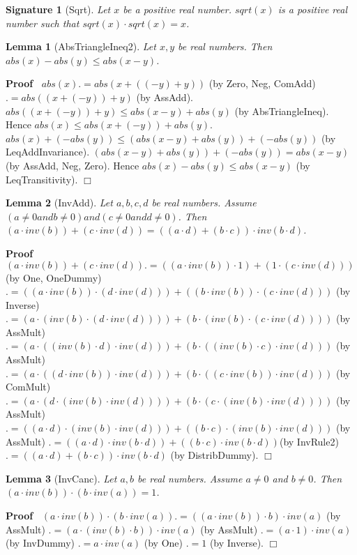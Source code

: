 \documentclass{article}
\newenvironment{forthel}{\begin{leftbar}}{\end{leftbar}}
\newenvironment{proof}{\noindent\textbf{Proof\ }}{\hspace*{\fill}$\Box$\medskip}
\newtheorem{lemma}{Lemma}
\newtheorem{signature}{Signature}
\begin{document}
\begin{forthel}
	
	
	\begin{signature}[Sqrt]
	Let $x$ be a positive real number. $sqrt(x)$ is a positive real number such that $sqrt(x) \cdot sqrt(x) = x$.
	\end{signature}
	
	\begin{lemma}[AbsTriangleIneq2]
	Let $x,y$ be real numbers. Then $abs(x) - abs(y) \leq abs(x - y)$.
	\end{lemma}
	\begin{proof}
	$abs(x) .= abs(x + ((-y) + y))$ (by Zero, Neg, ComAdd)
	$.= abs((x + (-y)) + y)$ (by AssAdd).
	$abs((x + (-y)) + y) \leq abs(x - y) + abs(y)$ (by AbsTriangleIneq).
	Hence $abs(x) \leq abs(x + (-y)) + abs(y)$.
	$abs(x) + (-abs(y)) \leq (abs(x - y) + abs(y)) + (-abs(y))$ (by LeqAddInvariance).
	$(abs(x - y) + abs(y)) + (-abs(y)) = abs(x - y)$ (by AssAdd, Neg, Zero).
	Hence $abs(x) - abs(y) \leq abs(x - y)$ (by LeqTransitivity).
	\end{proof}
	
	
	\begin{lemma}[InvAdd]
	Let $a,b,c,d$ be real numbers. Assume $(a \neq 0 and b \neq 0) and (c \neq 0 and d \neq 0)$. 
	Then $(a \cdot inv(b)) + (c \cdot inv(d)) = ((a \cdot d) + (b \cdot c)) \cdot inv(b \cdot d)$.
	\end{lemma}
	\begin{proof}
	$(a \cdot inv(b)) + (c \cdot inv(d)) .= ((a \cdot inv(b)) \cdot 1) + (1 \cdot (c \cdot inv(d)))$ (by One, OneDummy)
	$.= ((a \cdot inv(b)) \cdot (d \cdot inv(d))) + ((b \cdot inv(b)) \cdot (c \cdot inv(d)))$ (by Inverse)
	$.= (a \cdot (inv(b) \cdot (d \cdot inv(d)))) + (b \cdot (inv(b) \cdot (c \cdot inv(d))))$ (by AssMult)
	$.= (a \cdot ((inv(b) \cdot d) \cdot inv(d))) + (b \cdot ((inv(b) \cdot c) \cdot inv(d)))$ (by AssMult)
	$.= (a \cdot ((d \cdot inv(b)) \cdot inv(d))) + (b \cdot ((c \cdot inv(b)) \cdot inv(d)))$ (by ComMult)
	$.= (a \cdot (d \cdot (inv(b) \cdot inv(d)))) + (b \cdot (c \cdot (inv(b) \cdot inv(d))))$ (by AssMult)
	$.= ((a \cdot d) \cdot (inv(b) \cdot inv(d))) + ((b \cdot c) \cdot (inv(b) \cdot inv(d)))$ (by AssMult)
	$.= ((a \cdot d) \cdot inv(b \cdot d)) + ((b \cdot c) \cdot inv(b \cdot d)) $(by InvRule2)
	$.= ((a \cdot d) + (b \cdot c)) \cdot inv(b \cdot d)$ (by DistribDummy).
	\end{proof}
	
	
	
	\begin{lemma}[InvCanc]
	Let $a, b$ be real numbers. Assume $a \neq 0$ and $b \neq 0$.
	Then $(a \cdot inv(b)) \cdot (b \cdot inv(a)) = 1$.
	\end{lemma}
	\begin{proof}
	$(a \cdot inv(b)) \cdot (b \cdot inv(a)) .= ((a \cdot inv(b)) \cdot b) \cdot inv(a)$ (by AssMult)
	$.= (a \cdot (inv(b) \cdot b)) \cdot inv(a)$ (by AssMult)
	$.= (a \cdot 1) \cdot inv(a)$ (by InvDummy)
	$.= a \cdot inv(a)$ (by One)
	$.= 1$ (by Inverse).
	\end{proof}
	

\end{forthel}
\end{document}
